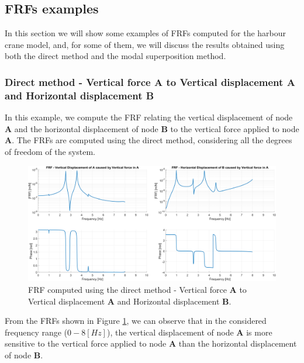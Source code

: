 \subsection{FRFs examples}
\label{subsec:FRFs_examples}

In this section we will show some examples of FRFs computed for the harbour crane model, and, for some of them, we will discuss the results obtained using both the direct method and the modal superposition method.

\subsubsection{Direct method - Vertical force \textbf{A} to Vertical displacement \textbf{A} and Horizontal displacement \textbf{B}}
\label{subsubsec:direct_method_vertical_force_A}

In this example, we compute the FRF relating the vertical displacement of node \textbf{A} and the horizontal displacement of node \textbf{B} to the vertical force applied to node \textbf{A}.
The FRFs are computed using the direct method, considering all the degrees of freedom of the system.

\begin{figure}[H]
    \centering
    \includegraphics[width=\textwidth]{img/MATLAB/FRFs/Vertical_in_A.png}
    \caption{FRF computed using the direct method - Vertical force \textbf{A} to Vertical displacement \textbf{A} and Horizontal displacement \textbf{B}.}
    \label{fig:FRF_direct_vertical_A}
\end{figure}

From the FRFs shown in Figure \ref{fig:FRF_direct_vertical_A}, we can observe that in the considered frequency range ($0-8 [Hz]$), the vertical displacement of node \textbf{A} is more sensitive to the vertical force applied to node \textbf{A} than the horizontal displacement of node \textbf{B}.

